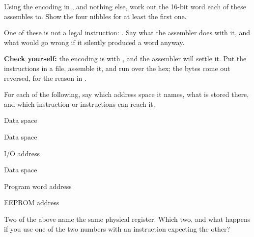 \label{c1:ex:assemble}
Using the encoding in , and nothing else, work out the 16-bit word each of
these assembles to. Show the four nibbles for at least the first one.
\begin{parts}
  \item {}
  \item {}
  \item {}
  \item {}
  \item One of these is not a legal instruction: . Say what the assembler does
    with it, and what would go wrong if it silently produced a word anyway.
\end{parts}

\noindent\textbf{Check yourself:} the encoding is  with
, and the assembler will settle it. Put the instructions in a  file,
assemble it, and run  over the hex; the bytes come out
reversed, for the reason in .

\label{c1:ex:spaces}
For each of the following, say which address space it names, what is stored there, and which
instruction or instructions can reach it.
\begin{parts}
  \item Data space 
  \item Data space 
  \item I/O address 
  \item Data space 
  \item Program word address 
  \item EEPROM address 
  \item Two of the above name the same physical register. Which two, and what happens if you use
    one of the two numbers with an instruction expecting the other?
\end{parts}

